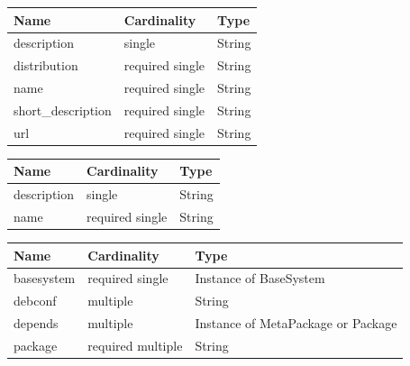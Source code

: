 \begin{table}[!h]
   \begin{center}
         \label{tab:main_class_base}
	\begin{tabular}{p{3cm}p{3cm}p{4cm}}
	\textbf{Name}  & \textbf{Cardinality}  & \textbf{Type}\\
	\hline
	description    & single                & String       \\
	distribution   & required single       & String       \\
	name           & required single       & String       \\
	short\_description & required single   & String       \\
	url            & required single       & String       \\
	\end{tabular} 
   \end{center}
\end{table}


\begin{table}[!h]
   \begin{center}
         \label{tab:main_class_tag}
	\begin{tabular}{p{3cm}p{3cm}p{4cm}}
	\textbf{Name}  & \textbf{Cardinality}  & \textbf{Type}\\
	\hline
	description    & single                & String       \\
	name           & required single       & String       \\
	\end{tabular} 
   \end{center}
\end{table}

\begin{table}[!h]
   \begin{center}
         \label{tab:main_class_debian}
	\begin{tabular}{p{3cm}p{3cm}p{6cm}}
	\textbf{Name} & \textbf{Cardinality} & \textbf{Type}\\
	\hline
	basesystem    & required single      & Instance of BaseSystem \\
	debconf       & multiple             & String \\
	depends       & multiple             & Instance of MetaPackage or Package \\
	package       & required multiple    & String \\
	\end{tabular} 
   \end{center}
\end{table}

